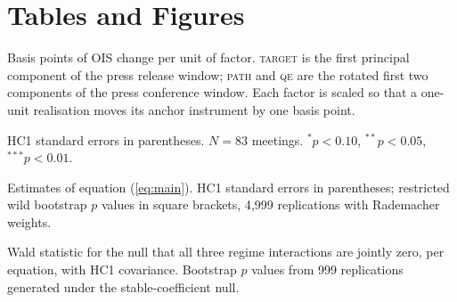 \documentclass[11pt]{article}
\newcommand{\fittable}[1]{%
  \savebox{\tblbox}{}%
  \ifdim\wd\tblbox>\textwidth
    \resizebox{\textwidth}{!}{\usebox{\tblbox}}%
  \else
    \usebox{\tblbox}%
  \fi
}
\begin{document}


\newpage
\appendix
\section*{Tables and Figures}

\begin{table}[htbp]\centering
\caption{Factor loadings. The shapes are not imposed --- only one zero restriction is}
\label{tab:loadings}
\fittable{../output/tables/t1_loadings.tex}
\begin{minipage}{\textwidth}\footnotesize\vspace{4pt}
Basis points of OIS change per unit of factor. \textsc{target} is the first
principal component of the press release window; \textsc{path} and \textsc{qe}
are the rotated first two components of the press conference window. Each factor
is scaled so that a one-unit realisation moves its anchor instrument by one basis
point.
\end{minipage}
\end{table}

\begin{table}[htbp]\centering\footnotesize
\caption{Baseline responses. All three factors move the curve; the balance-sheet factor moves every maturity by about one}
\label{tab:baseline}
\fittable{../output/tables/t3_baseline.tex}
\begin{minipage}{\textwidth}\footnotesize\vspace{4pt}
HC1 standard errors in parentheses. $N = 83$ meetings.
$^{*}p<0.10$, $^{**}p<0.05$, $^{***}p<0.01$.
\end{minipage}
\end{table}

\begin{table}[htbp]\centering\footnotesize
\caption{Regime interactions. Only two coefficients change: the path response at the long end, and the target response on the slope}
\label{tab:interaction}
\fittable{../output/tables/t4_interaction.tex}
\begin{minipage}{\textwidth}\footnotesize\vspace{4pt}
Estimates of equation (\ref{eq:main}). HC1 standard errors in parentheses;
restricted wild bootstrap $p$ values in square brackets, 4{,}999 replications
with Rademacher weights.
\end{minipage}
\end{table}

\begin{table}[htbp]\centering\footnotesize
\caption{Joint stability tests. Coefficient constancy is not rejected in any equation --- the evidence is a pattern, not a break}
\label{tab:stability}
\fittable{../output/tables/t12_stability.tex}
\begin{minipage}{\textwidth}\footnotesize\vspace{4pt}
Wald statistic for the null that all three regime interactions are jointly zero,
per equation, with HC1 covariance. Bootstrap $p$ values from 999 replications
generated under the stable-coefficient null.
\end{minipage}
\end{table}
\end{document}
